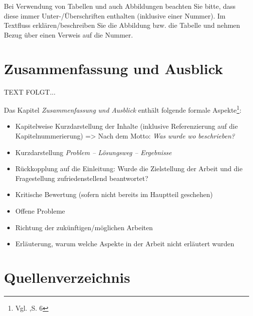 \documentclass[a4paper,12pt,oneside]{article}
\begin{document}
    \vspace{1cm}
 \begin{tcolorbox}[title={Abbildungen, Tabellen \& Co.}]
Bei Verwendung von Tabellen und auch Abbildungen beachten Sie bitte, dass diese immer Unter-/Überschriften enthalten (inklusive einer Nummer). Im Textfluss erklären/beschreiben Sie die Abbildung bzw. die Tabelle und nehmen Bezug über einen Verweis auf die Nummer.
  \end{tcolorbox}
  
  
  \newpage 
  \section{Zusammenfassung und Ausblick}\label{kap_zusammfAusbl}  
   TEXT FOLGT...
   
    \vspace{1cm}
 \begin{tcolorbox}[title={Inhalte der \textit{Zusammenfassung und Ausblick}}]
Das Kapitel \textit{Zusammenfassung und Ausblick} enthält folgende formale Aspekte\footnote{Vgl. \cite{BBoJ},S. 6}:
\begin{itemize}
\item Kapitelweise Kurzdarstellung der Inhalte (inklusive Referenzierung auf die Kapitelnummerierung) => Nach dem Motto: \textit{Was wurde wo beschrieben?}
\item Kurzdarstellung \textit{Problem – Lösungsweg – Ergebnisse}
\item Rückkopplung auf die Einleitung: Wurde die Zielstellung der Arbeit und die Fragestellung zufriedenstellend beantwortet?
\item Kritische Bewertung (sofern nicht bereits im Hauptteil geschehen)
\item Offene Probleme
\item Richtung der zukünftigen/möglichen Arbeiten
\item Erläuterung, warum welche Aspekte in der Arbeit nicht erläutert wurden
\end{itemize}
  \end{tcolorbox}
   
   \newpage
    \thispagestyle{empty}
   \section{Quellenverzeichnis}
\end{document}
